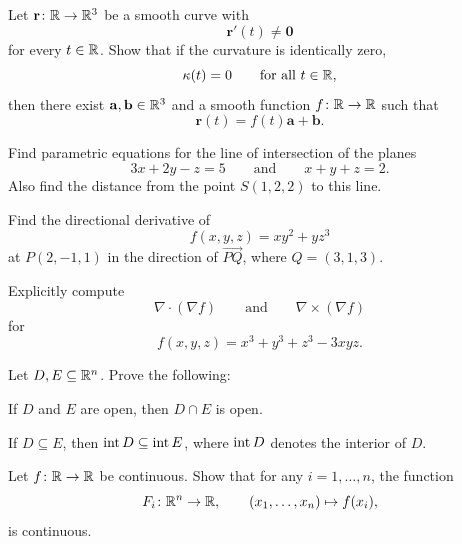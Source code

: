 \begin{problem}
Let $\mathbf r\colon\mathbb{R}\to\mathbb{R}^3$ be a smooth curve with
\[
\mathbf r'(t)\ne\mathbf0
\]
for every $t\in\mathbb{R}$. Show that if the curvature is identically zero,
\[
\kappa(t)=0
\qquad\text{for all }t\in\mathbb{R},
\]
then there exist $\mathbf a,\mathbf b\in\mathbb{R}^3$ and a smooth function $f\colon\mathbb{R}\to\mathbb{R}$ such that
\[
\mathbf r(t)=f(t)\mathbf a+\mathbf b.
\]
\end{problem}

\begin{problem}
Find parametric equations for the line of intersection of the planes
\[
3x+2y-z=5
\qquad\text{and}\qquad
x+y+z=2.
\]
Also find the distance from the point $S(1,2,2)$ to this line.
\end{problem}

\begin{problem}
Find the directional derivative of
\[
f(x,y,z)=xy^2+yz^3
\]
at $P(2,-1,1)$ in the direction of $\overrightarrow{PQ}$, where $Q=(3,1,3)$.
\end{problem}

\begin{problem}
Explicitly compute
\[
\nabla\cdot(\nabla f)
\qquad\text{and}\qquad
\nabla\times(\nabla f)
\]
for
\[
f(x,y,z)=x^3+y^3+z^3-3xyz.
\]
\end{problem}

\begin{problem}
Let $D,E\subseteq\mathbb{R}^n$. Prove the following:
\begin{problemsubparts}
\item If $D$ and $E$ are open, then $D\cap E$ is open.
\item If $D\subseteq E$, then $\operatorname{int} D\subseteq\operatorname{int} E$, where $\operatorname{int} D$ denotes the interior of $D$.
\end{problemsubparts}
\end{problem}

\begin{problem}
Let $f\colon\mathbb{R}\to\mathbb{R}$ be continuous. Show that for any $i=1,\ldots,n$, the function
\[
F_i\colon\mathbb{R}^n\to\mathbb{R},
\qquad
(x_1,\ldots,x_n)\mapsto f(x_i),
\]
is continuous.
\end{problem}

